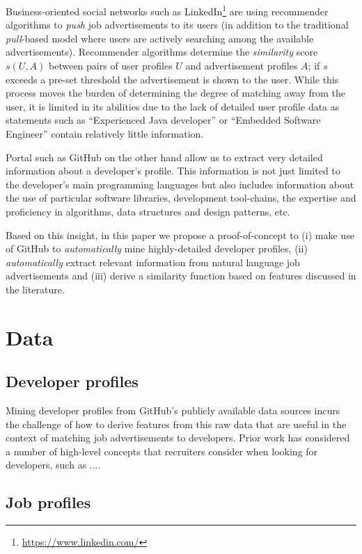 \documentclass{sig-alternate}
\begin{document}
Business-oriented social networks such as LinkedIn\footnote{\url{https://www.linkedin.com/}} are using recommender algorithms to \emph{push} job advertisements to its users (in addition to the traditional \emph{pull}-based model where users are actively searching among the available advertisements). Recommender algorithms determine the \emph{similarity} score $s(U,A)$ between pairs of user profiles $U$ and advertisement profiles $A$; if $s$ exceeds a pre-set threshold the advertisement is shown to the user. While this process moves the burden of determining the degree of matching away from the user, it is limited in its abilities due to the lack of detailed user profile data as statements such as ``Experienced Java developer'' or ``Embedded Software Engineer'' contain relatively little information.

Portal such as GitHub on the other hand allow us to extract very detailed information about a developer's profile. This information is not just limited to the developer's main programming languages but also includes information about the use of particular software libraries, development tool-chains, the expertise and proficiency in algorithms, data structures and design patterns, etc.

Based on this insight, in this paper we propose a proof-of-concept to (i) make use of GitHub to \emph{automatically} mine highly-detailed developer profiles, (ii) \emph{automatically} extract relevant information from natural language job advertisements and (iii) derive a similarity function based on features discussed in the literature. 


\section{Data}

\subsection{Developer profiles}

Mining developer profiles from GitHub's publicly available data sources incurs the challenge of how to derive features from this raw data that are useful in the context of matching job advertisements to developers. Prior work has considered a number of high-level concepts that recruiters consider when looking for developers, such as ....

\subsection{Job profiles}
\end{document}
